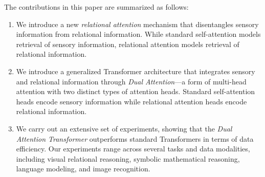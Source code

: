 The contributions in this paper are summarized as follows:
\begin{enumerate}
  \item We introduce a new \textit{relational attention} mechanism that disentangles sensory information from relational information. While standard self-attention models retrieval of sensory information, relational attention models retrieval of relational information.
  \item We introduce a generalized Transformer architecture that integrates sensory and relational information through \textit{Dual Attention}---a form of multi-head attention with two distinct types of attention heads. Standard self-attention heads encode sensory information while relational attention heads encode relational information.
  \item We carry out an extensive set of experiments, showing that the \textit{Dual Attention Transformer} outperforms standard Transformers in terms of data efficiency. Our experiments range across several tasks and data modalities, including visual relational reasoning, symbolic mathematical reasoning, language modeling, and image recognition.
\end{enumerate}


